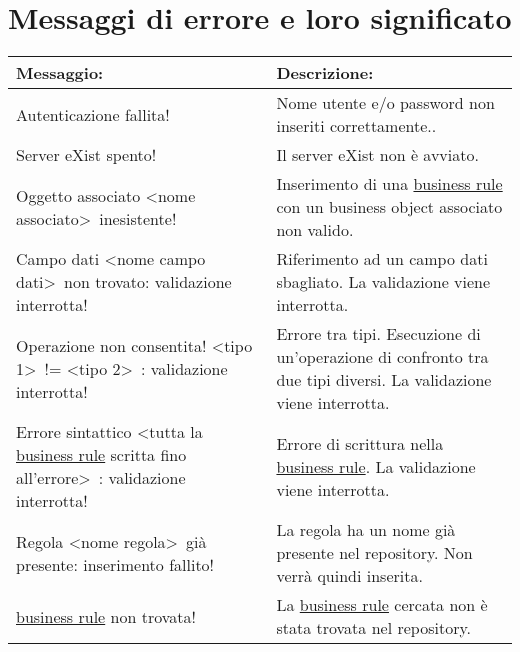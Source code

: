 \section{Messaggi di errore e loro significato}
\begin{table}[htbp]
\begin{tabular}{||p{6.5cm}||p{6.5cm}||}
\hline
\textbf{Messaggio:} & \textbf{Descrizione:} \\ \hline
Autenticazione fallita! & Nome utente e/o password non inseriti correttamente..\\ \hline
Server eXist spento! & Il server eXist non \`e avviato. \\ \hline
Oggetto associato \textless nome associato\textgreater\ inesistente! & Inserimento di una \underline{business rule} con un business object associato non valido. \\ \hline
Campo dati \textless nome campo dati\textgreater\ non trovato: validazione interrotta! & Riferimento ad un campo dati sbagliato. La validazione viene interrotta. \\ \hline
Operazione non consentita! \textless tipo 1\textgreater\ != \textless tipo 2\textgreater\ : validazione interrotta! & Errore tra tipi. Esecuzione di un'operazione di confronto tra due tipi diversi. La validazione viene interrotta. \\ \hline
Errore sintattico \textless tutta la \underline{business rule} scritta fino all'errore\textgreater\ : validazione interrotta! & Errore di scrittura nella \underline{business rule}. La validazione viene interrotta. \\ \hline
Regola \textless nome regola\textgreater\  gi\`a presente: inserimento fallito! & La regola ha un nome gi\`a presente nel repository. Non verr\`a quindi inserita. \\ \hline
\underline{business rule} non trovata! & La \underline{business rule} cercata non \`e stata trovata nel repository. \\ \hline
\end{tabular} \\
\end{table}



